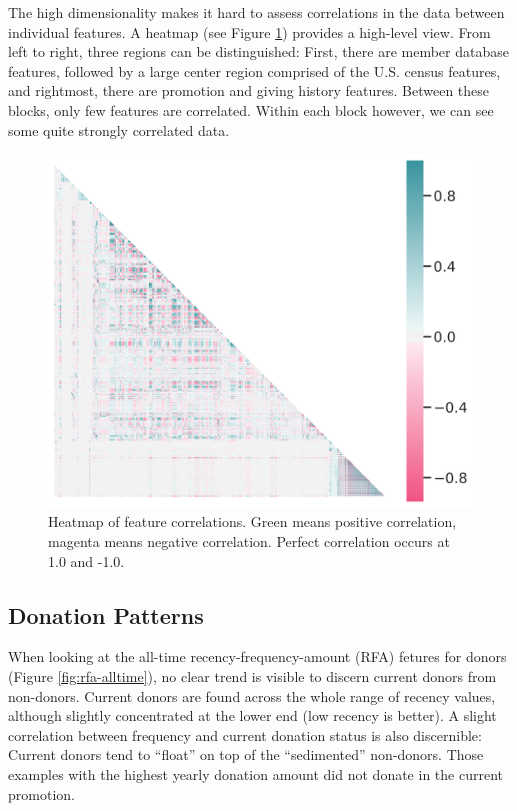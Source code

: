 \documentclass[
  11pt,
  a4paper,
  DIV=12,captions=tableheading,oneside,titlepage]{scrbook}
\begin{document}
The high dimensionality makes it hard to assess correlations in the data between individual features. A heatmap (see Figure \ref{fig:heatmap-all}) provides a high-level view. From left to right, three regions can be distinguished: First, there are member database features, followed by a large center region comprised of the U.S. census features, and rightmost, there are promotion and giving history features. Between these blocks, only few features are correlated. Within each block however, we can see some quite strongly correlated data.



\begin{figure}

{\centering \includegraphics[width=0.7\linewidth]{figures/eda/correlations-all} 

}

\caption{Heatmap of feature correlations. Green means positive correlation, magenta means negative correlation. Perfect correlation occurs at 1.0 and -1.0.}\label{fig:heatmap-all}
\end{figure}

\hypertarget{donation-patterns}{%
\subsection{Donation Patterns}\label{donation-patterns}}

When looking at the all-time recency-frequency-amount (RFA) fetures for donors (Figure \ref{fig:rfa-alltime}), no clear trend is visible to discern current donors from non-donors. Current donors are found across the whole range of recency values, although slightly concentrated at the lower end (low recency is better). A slight correlation between frequency and current donation status is also discernible: Current donors tend to ``float'' on top of the ``sedimented'' non-donors. Those examples with the highest yearly donation amount did not donate in the current promotion.
\end{document}
